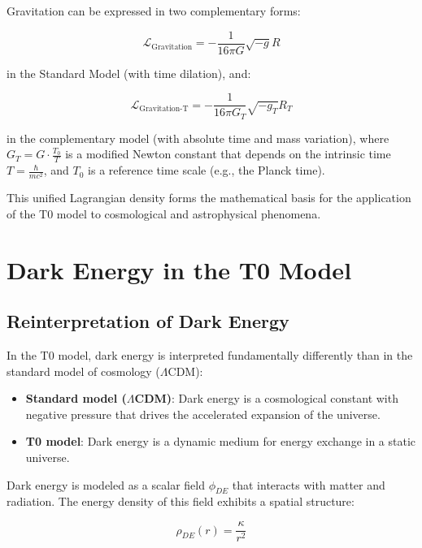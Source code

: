\documentclass[a4paper,12pt]{article}
\begin{document}
	Gravitation can be expressed in two complementary forms:
	
	\begin{equation}
		\mathcal{L}_\text{Gravitation} = -\frac{1}{16\pi G} \sqrt{-g} R
	\end{equation}
	
	in the Standard Model (with time dilation), and:
	
	\begin{equation}
		\mathcal{L}_\text{Gravitation-T} = -\frac{1}{16\pi G_T} \sqrt{-g_T} R_T
	\end{equation}
	
	in the complementary model (with absolute time and mass variation), where $G_T = G \cdot \frac{T_0}{T}$ is a modified Newton constant that depends on the intrinsic time $T = \frac{\hbar}{mc^2}$, and $T_0$ is a reference time scale (e.g., the Planck time).
	
	This unified Lagrangian density forms the mathematical basis for the application of the T0 model to cosmological and astrophysical phenomena.
	
	\section{Dark Energy in the T0 Model}
	
	\subsection{Reinterpretation of Dark Energy}
	
	In the T0 model, dark energy is interpreted fundamentally differently than in the standard model of cosmology ($\Lambda$CDM):
	
	\begin{itemize}
		\item \textbf{Standard model ($\Lambda$CDM)}: Dark energy is a cosmological constant with negative pressure that drives the accelerated expansion of the universe.
		\item \textbf{T0 model}: Dark energy is a dynamic medium for energy exchange in a static universe.
	\end{itemize}
	
	Dark energy is modeled as a scalar field $\phi_{DE}$ that interacts with matter and radiation. The energy density of this field exhibits a spatial structure:
	
	\begin{equation}
		\rho_{DE}(r) = \frac{\kappa}{r^2}
	\end{equation}
	
\end{document}
